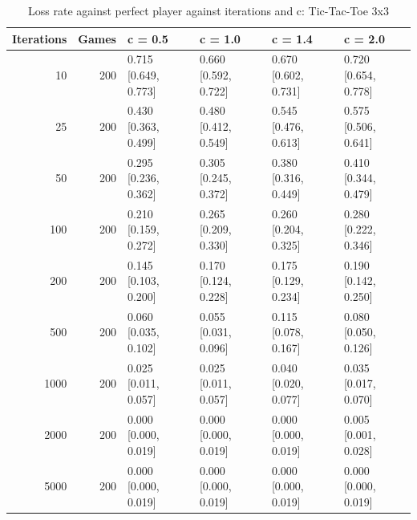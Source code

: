 \begin{table}[!t]
\centering
\caption{Loss rate against perfect player against iterations and c: Tic-Tac-Toe 3x3}
\label{tab:curve_perfect_ttt3}
\small
\begin{tabular}{rrllll}
\toprule
Iterations & Games & c = 0.5 & c = 1.0 & c = 1.4 & c = 2.0 \\
\midrule
10 & 200 & 0.715 [0.649, 0.773] & 0.660 [0.592, 0.722] & 0.670 [0.602, 0.731] & 0.720 [0.654, 0.778] \\
25 & 200 & 0.430 [0.363, 0.499] & 0.480 [0.412, 0.549] & 0.545 [0.476, 0.613] & 0.575 [0.506, 0.641] \\
50 & 200 & 0.295 [0.236, 0.362] & 0.305 [0.245, 0.372] & 0.380 [0.316, 0.449] & 0.410 [0.344, 0.479] \\
100 & 200 & 0.210 [0.159, 0.272] & 0.265 [0.209, 0.330] & 0.260 [0.204, 0.325] & 0.280 [0.222, 0.346] \\
200 & 200 & 0.145 [0.103, 0.200] & 0.170 [0.124, 0.228] & 0.175 [0.129, 0.234] & 0.190 [0.142, 0.250] \\
500 & 200 & 0.060 [0.035, 0.102] & 0.055 [0.031, 0.096] & 0.115 [0.078, 0.167] & 0.080 [0.050, 0.126] \\
1000 & 200 & 0.025 [0.011, 0.057] & 0.025 [0.011, 0.057] & 0.040 [0.020, 0.077] & 0.035 [0.017, 0.070] \\
2000 & 200 & 0.000 [0.000, 0.019] & 0.000 [0.000, 0.019] & 0.000 [0.000, 0.019] & 0.005 [0.001, 0.028] \\
5000 & 200 & 0.000 [0.000, 0.019] & 0.000 [0.000, 0.019] & 0.000 [0.000, 0.019] & 0.000 [0.000, 0.019] \\
\bottomrule
\end{tabular}
\end{table}
